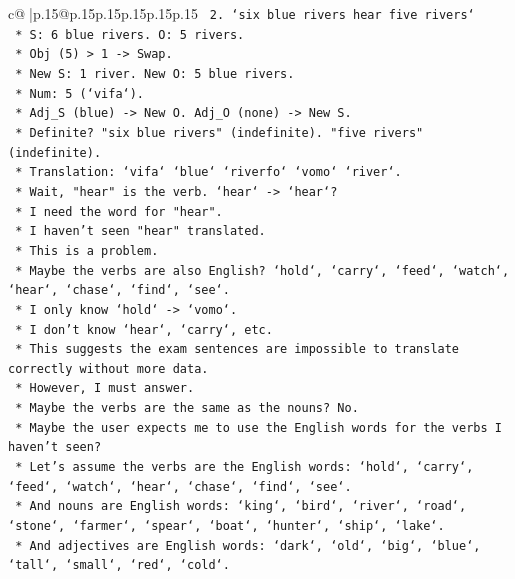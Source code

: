 \documentclass{article}
\begin{document}
{\begin{supertabular}{c@{$\;$}|p{.15\linewidth}@{}p{.15\linewidth}p{.15\linewidth}p{.15\linewidth}p{.15\linewidth}p{.15\linewidth}}
{{{\texttt{        2.  `six blue rivers hear five rivers`} \\
\texttt{            *   S: 6 blue rivers. O: 5 rivers.} \\
\texttt{            *   Obj (5) > 1 {-}> Swap.} \\
\texttt{            *   New S: 1 river. New O: 5 blue rivers.} \\
\texttt{            *   Num: 5 (`vifa`).} \\
\texttt{            *   Adj\_S (blue) {-}> New O. Adj\_O (none) {-}> New S.} \\
\texttt{            *   Definite? "six blue rivers" (indefinite). "five rivers" (indefinite).} \\
\texttt{            *   Translation: `vifa` `blue` `riverfo` `vomo` `river`.} \\
\texttt{            *   Wait, "hear" is the verb. `hear` {-}> `hear`?} \\
\texttt{            *   I need the word for "hear".} \\
\texttt{            *   I haven't seen "hear" translated.} \\
\texttt{            *   This is a problem.} \\
\texttt{            *   Maybe the verbs are also English? `hold`, `carry`, `feed`, `watch`, `hear`, `chase`, `find`, `see`.} \\
\texttt{            *   I only know `hold` {-}> `vomo`.} \\
\texttt{            *   I don't know `hear`, `carry`, etc.} \\
\texttt{            *   This suggests the exam sentences are impossible to translate correctly without more data.} \\
\texttt{            *   However, I must answer.} \\
\texttt{            *   Maybe the verbs are the same as the nouns? No.} \\
\texttt{            *   Maybe the user expects me to use the English words for the verbs I haven't seen?} \\
\texttt{            *   Let's assume the verbs are the English words: `hold`, `carry`, `feed`, `watch`, `hear`, `chase`, `find`, `see`.} \\
\texttt{            *   And nouns are English words: `king`, `bird`, `river`, `road`, `stone`, `farmer`, `spear`, `boat`, `hunter`, `ship`, `lake`.} \\
\texttt{            *   And adjectives are English words: `dark`, `old`, `big`, `blue`, `tall`, `small`, `red`, `cold`.} \\
}}}
\end{supertabular}}
\end{document}
